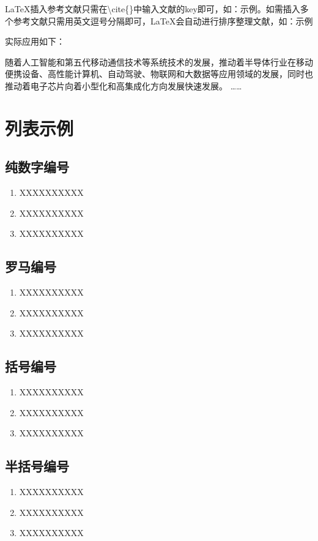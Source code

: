     \LaTeX 插入参考文献只需在\textbackslash{cite\{\}}中输入文献的key即可，如：示例\cite{Lau_2022}。如需插入多个参考文献只需用英文逗号分隔即可，\LaTeX 会自动进行排序整理文献，如：示例\cite{Sadique.Murtaza.ea_2022, Tan.Du.ea_2021, Lau_2022}

    实际应用如下：

    随着人工智能和第五代移动通信技术等系统技术的发展\cite{Lau_2022}，推动着半导体行业在移动便携设备、高性能计算机、自动驾驶、物联网和大数据等应用领域的发展\cite{Lau_2022}，同时也推动着电子芯片向着小型化和高集成化方向发展快速发展\cite{Lau_2022,Sadique.Murtaza.ea_2022, Tan.Du.ea_2021}。
……

\section{列表示例}

\subsection{纯数字编号}
\begin{enumerate}
 \item XXXXXXXXXX
 \label{item1}
 \item XXXXXXXXXX
 \item XXXXXXXXXX
\end{enumerate}

\subsection{罗马编号}
\begin{enumerate}[label=(\roman*)]
 \item XXXXXXXXXX
 \label{item2}
 \item XXXXXXXXXX
 \item XXXXXXXXXX
\end{enumerate}

\subsection{括号编号}
\begin{enumerate}[label=(\arabic*)]
 \item XXXXXXXXXX
 \label{item3}
 \item XXXXXXXXXX
 \item XXXXXXXXXX
\end{enumerate}

\subsection{半括号编号}
\begin{enumerate}[label=\arabic*)]
 \item XXXXXXXXXX
 \label{item4}
 \item XXXXXXXXXX
 \item XXXXXXXXXX
\end{enumerate}

